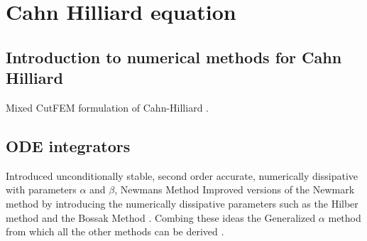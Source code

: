 
\newpage
\section{Cahn Hilliard equation }%
\label{sec:cahn_hilliard_equation}

\subsection{Introduction to numerical methods for Cahn Hilliard}%
\label{sub:introduction_to_numerical_methods_for_cahn_hilliard}

Mixed CutFEM formulation of Cahn-Hilliard \cite{karatzas2021reduced}.


\subsection{ODE integrators}%
\label{sub:ode_integrators}

      Introduced unconditionally stable, second order accurate, numerically dissipative with parameters $\alpha$ and $ \beta $,  Newmans Method \cite{newmark1959method}
    Improved versions of the Newmark method by introducing the numerically dissipative parameters such as the Hilber method and the Bossak Method \cite{hilber1977improved, wood1980alpha}. Combing these ideas the Generalized $\alpha $ method from which all the other methods can be derived \cite{chung1993time}.


\newpage

